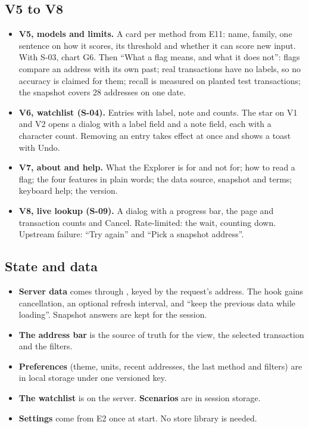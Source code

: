 \subsection{V5 to V8}
\label{sec:viewwatch}

\begin{itemize}
  \item \textbf{V5, models and limits.} A card per method from E11: name, family, one sentence on
    how it scores, its threshold and whether it can score new input. With S-03, chart G6. Then
    ``What a flag means, and what it does not'': flags compare an address with its own past; real
    transactions have no labels, so no accuracy is claimed for them; recall is measured on planted
    test transactions; the snapshot covers 28 addresses on one date.
  \item \textbf{V6, watchlist (S-04).} Entries with label, note and counts. The star on V1 and V2
    opens a dialog with a label field and a note field, each with a character count. Removing an
    entry takes effect at once and shows a toast with Undo.
  \item \textbf{V7, about and help.} What the Explorer is for and not for; how to read a flag; the
    four features in plain words; the data source, snapshot and terms; keyboard help; the version.
  \item \textbf{V8, live lookup (S-09).} A dialog with a progress bar, the page and transaction
    counts and Cancel. Rate-limited: the wait, counting down. Upstream failure: ``Try again'' and
    ``Pick a snapshot address''.
\end{itemize}

\subsection{State and data}

\begin{itemize}
  \item \textbf{Server data} comes through , keyed by the request's address. The
    hook gains cancellation, an optional refresh interval, and ``keep the previous data while
    loading''. Snapshot answers are kept for the session.
  \item \textbf{The address bar} is the source of truth for the view, the selected transaction
    and the filters.
  \item \textbf{Preferences} (theme, units, recent addresses, the last method and filters) are in
    local storage under one versioned key.
  \item \textbf{The watchlist} is on the server. \textbf{Scenarios} are in session storage.
  \item \textbf{Settings} come from E2 once at start. No store library is needed.
\end{itemize}

